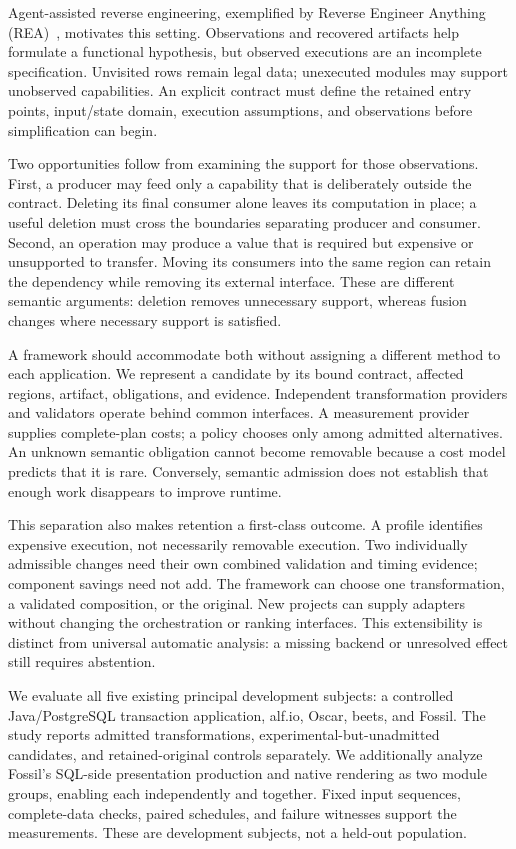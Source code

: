 \documentclass[acmsmall,screen,review,anonymous]{acmart}
\begin{document}
Agent-assisted reverse engineering, exemplified by Reverse Engineer Anything
(REA)~\cite{rea}, motivates this setting. Observations and recovered artifacts
help formulate a functional hypothesis, but observed executions are an incomplete
specification. Unvisited rows remain legal data; unexecuted modules may support
unobserved capabilities. An explicit contract must define the retained entry
points, input/state domain, execution assumptions, and observations before
simplification can begin.

Two opportunities follow from examining the support for those observations.
First, a producer may feed only a capability that is deliberately outside the
contract. Deleting its final consumer alone leaves its computation in place;
a useful deletion must cross the boundaries separating producer and consumer.
Second, an operation may produce a value that is required but expensive or
unsupported to transfer. Moving its consumers into the same region can retain
the dependency while removing its external interface. These are different
semantic arguments: deletion removes unnecessary support, whereas fusion changes
where necessary support is satisfied.

A framework should accommodate both without assigning a different method to
each application. We represent a candidate by its bound contract, affected
regions, artifact, obligations, and evidence. Independent transformation providers
and validators operate behind common interfaces. A measurement provider supplies
complete-plan costs; a policy chooses only among admitted alternatives. An
unknown semantic obligation cannot become removable because a cost model predicts
that it is rare. Conversely, semantic admission does not establish that enough
work disappears to improve runtime.

This separation also makes retention a first-class outcome. A profile identifies
expensive execution, not necessarily removable execution. Two individually
admissible changes need their own combined validation and timing evidence;
component savings need not add. The framework can choose one transformation,
a validated composition, or the original. New projects can supply adapters
without changing the orchestration or ranking interfaces. This extensibility
is distinct from universal automatic analysis: a missing backend or unresolved
effect still requires abstention.

We evaluate all five existing principal development subjects: a controlled
Java/PostgreSQL transaction application, alf.io, Oscar, beets, and Fossil.
The study reports admitted transformations, experimental-but-unadmitted
candidates, and retained-original controls separately. We additionally analyze
Fossil's SQL-side presentation production and native rendering as two module
groups, enabling each independently and together. Fixed input sequences,
complete-data checks, paired schedules, and failure witnesses support the
measurements. These are development subjects, not a held-out population.
\end{document}
